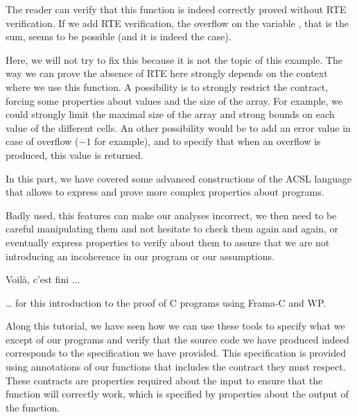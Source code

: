 \documentclass[middle]{zmdocument}
\begin{document}
The reader can verify that this function is indeed correctly proved
without RTE verification. If we add RTE verification, the overflow on
the variable , that is the sum, seems to be possible (and it
is indeed the case).




Here, we will not try to fix this because it is not the topic of this
example. The way we can prove the absence of RTE here strongly depends
on the context where we use this function. A possibility is to strongly
restrict the contract, forcing some properties about values and the size
of the array. For example, we could strongly limit the maximal size of
the array and strong bounds on each value of the different cells. An
other possibility would be to add an error value in case of overflow
(\(-1\) for example), and to specify that when an overflow is produced,
this value is returned.



\horizontalLine



In this part, we have covered some advanced constructions of the ACSL
language that allows to express and prove more complex properties about
programs.

Badly used, this features can make our analyses incorrect, we then need
to be careful manipulating them and not hesitate to check them again and
again, or eventually express properties to verify about them to assure
that we are not introducing an incoherence in our program or our
assumptions.





\begin{Quotation}
Voilà, c'est fini ...
\end{Quotation}



\ldots{} for this introduction to the proof of C programs using Frama-C
and WP.

Along this tutorial, we have seen how we can use these tools to specify
what we except of our programs and verify that the source code we have
produced indeed corresponds to the specification we have provided. This
specification is provided using annotations of our functions that
includes the contract they must respect. These contracts are properties
required about the input to ensure that the function will correctly
work, which is specified by properties about the output of the function.
\end{document}
